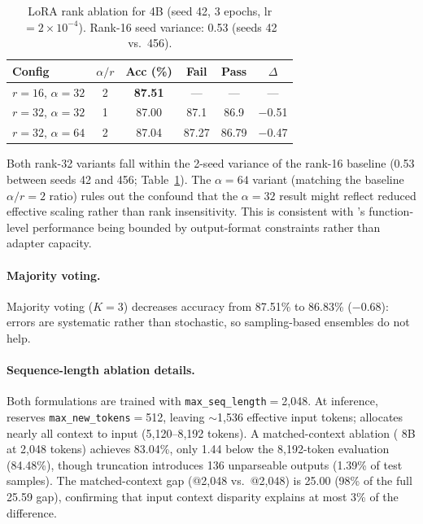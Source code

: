 \begin{table}[h]
\centering
\small
\caption{LoRA rank ablation for \cwm{} 4B (seed 42, 3 epochs, lr $= 2{\times}10^{-4}$). Rank-16 seed variance: 0.53\pp{} (seeds 42 vs.\ 456).}
\label{tab:rank_ablation}
\setlength{\tabcolsep}{4pt}
\begin{tabular}{lccccc}
\toprule
\textbf{Config} & \textbf{$\alpha/r$} & \textbf{Acc (\%)} & \textbf{Fail \fone{}} & \textbf{Pass \fone{}} & \textbf{$\Delta$} \\
\midrule
$r{=}16$, $\alpha{=}32$ & 2 & \textbf{87.51} & --- & --- & --- \\
$r{=}32$, $\alpha{=}32$ & 1 & 87.00 & 87.1 & 86.9 & $-$0.51 \\
$r{=}32$, $\alpha{=}64$ & 2 & 87.04 & 87.27 & 86.79 & $-$0.47 \\
\bottomrule
\end{tabular}
\end{table}

Both rank-32 variants fall within the 2-seed variance of the rank-16 baseline (0.53\pp{} between seeds 42 and 456; Table~\ref{tab:rank_ablation}). The $\alpha{=}64$ variant (matching the baseline $\alpha/r{=}2$ ratio) rules out the confound that the $\alpha{=}32$ result might reflect reduced effective scaling rather than rank insensitivity. This is consistent with \cwm{}'s function-level performance being bounded by output-format constraints rather than adapter capacity.

\paragraph{Majority voting.}
Majority voting ($K{=}3$) decreases accuracy from 87.51\% to 86.83\% ($-$0.68\pp{}): errors are systematic rather than stochastic, so sampling-based ensembles do not help.

\paragraph{Sequence-length ablation details.}
Both formulations are trained with \texttt{max\_seq\_length}$=$2,048. At inference, \cwm{} reserves \texttt{max\_new\_tokens}$=$512, leaving ${\sim}$1,536 effective input tokens; \cls{} allocates nearly all context to input (5,120--8,192 tokens). A matched-context ablation (\cls{} 8B at 2,048 tokens) achieves 83.04\%, only 1.44\pp{} below the 8,192-token evaluation (84.48\%), though truncation introduces 136 unparseable outputs (1.39\% of test samples). The matched-context gap (\cls{}@2,048 vs.\ \cwm{}@2,048) is 25.00\pp{} (98\% of the full 25.59\pp{} gap), confirming that input context disparity explains at most 3\% of the difference.

